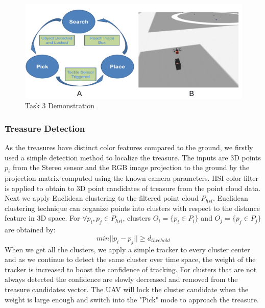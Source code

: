 \documentclass{standalone}
\begin{document}
 \begin{figure}%
    \begin{center}
      \includegraphics[keepaspectratio=true, width=1\linewidth, height=0.30\textheight]{img//task3.png}
    \end{center}
    \caption{Task 3 Demonstration}
    \label{t3}
  \end{figure}



\subsubsection{Treasure Detection}
As the treasures have distinct color features compared to the ground, we firstly used a simple detection method to localize the treasure. 
The inputs are 3D points $p_i$ from the Stereo sensor and the RGB image projection to the ground by the projection matrix computed using the known camera parameters. %
HSI color filter is applied to obtain to 3D point candidates of treasure from the point cloud data. Next we apply Euclidean clustering to the filtered point cloud $P_{hsi}$. Euclidean clustering technique can organize points into clusters with respect to the distance feature in 3D space. For $\forall p_i, p_j \in P_{hsi}$, clusters $O_i = \{p_i \in P_i\}$ and $O_j = \{p_j \in P_j\}$ are obtained by:
\begin{equation}\label{eq3-1}
min||p_i - p_j|| \geq d_{threhold} 
\end{equation}
When we get all the clusters, we apply a simple tracker to every cluster center and as we continue to detect the same cluster over time space, the weight of the tracker is increased to boost the confidence of tracking. For clusters that are not always detected the confidence are slowly decreased and removed from the treasure candidates vector. The UAV will lock the cluster candidate when the weight is large enough and switch into the "Pick" mode to approach the treasure.
\end{document}
